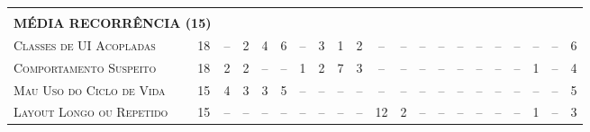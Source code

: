 \begin{table*}
\begin{tabular}{@{}p{3.5cm}p{0.3cm}p{.2cm}p{.2cm}p{.2cm}p{.2cm}p{.2cm}p{.2cm}p{.2cm}p{.2cm}p{.2cm}p{.4cm}p{.4cm}p{.4cm}p{.4cm}p{.4cm}p{.4cm}p{.4cm}p{.4cm}p{.4cm}p{0.2cm}@{}}
\vspace{1sp} \\
\multicolumn{2}{l}{\scriptsize{\textbf{MÉDIA RECORRÊNCIA (15)}}} \\ 
\textsc{Classes de UI Acopladas}           	& \multicolumn{1}{c}{18} 	& \multicolumn{1}{c}{--} 	& \multicolumn{1}{c}{2} 	& \multicolumn{1}{c}{4}	 	& \multicolumn{1}{c}{6} 	& \multicolumn{1}{c}{--} 	& \multicolumn{1}{c}{3} 	& \multicolumn{1}{c}{1} 	& \multicolumn{1}{c}{2} 	& \multicolumn{1}{c}{--} 	& \multicolumn{1}{c}{--} 	& \multicolumn{1}{c}{--} 	& \multicolumn{1}{c}{--} 	& \multicolumn{1}{c}{--} 	& \multicolumn{1}{c}{--} 	& \multicolumn{1}{c}{--}	& \multicolumn{1}{c}{--} 	& \multicolumn{1}{c}{--} 	& \multicolumn{1}{c}{--} 	& \multicolumn{1}{c}{6} \\
\textsc{Comportamento Suspeito}            	& \multicolumn{1}{c}{18} 	& \multicolumn{1}{c}{2} 	& \multicolumn{1}{c}{2} 	& \multicolumn{1}{c}{--} 	& \multicolumn{1}{c}{--} 	& \multicolumn{1}{c}{1} 	& \multicolumn{1}{c}{2} 	& \multicolumn{1}{c}{7} 	& \multicolumn{1}{c}{3} 	& \multicolumn{1}{c}{--} 	& \multicolumn{1}{c}{--} 	& \multicolumn{1}{c}{--} 	& \multicolumn{1}{c}{--} 	& \multicolumn{1}{c}{--} 	& \multicolumn{1}{c}{--} 	& \multicolumn{1}{c}{--}	& \multicolumn{1}{c}{--} 	& \multicolumn{1}{c}{1} 	& \multicolumn{1}{c}{--} 	& \multicolumn{1}{c}{4} \\
\textsc{Mau Uso do Ciclo de Vida}          	& \multicolumn{1}{c}{15} 	& \multicolumn{1}{c}{4} 	& \multicolumn{1}{c}{3} 	& \multicolumn{1}{c}{3}	 	& \multicolumn{1}{c}{5} 	& \multicolumn{1}{c}{--} 	& \multicolumn{1}{c}{--} 	& \multicolumn{1}{c}{--} 	& \multicolumn{1}{c}{--} 	& \multicolumn{1}{c}{--} 	& \multicolumn{1}{c}{--} 	& \multicolumn{1}{c}{--} 	& \multicolumn{1}{c}{--} 	& \multicolumn{1}{c}{--} 	& \multicolumn{1}{c}{--} 	& \multicolumn{1}{c}{--}	& \multicolumn{1}{c}{--} 	& \multicolumn{1}{c}{--} 	& \multicolumn{1}{c}{--} 	& \multicolumn{1}{c}{5} \\
\textsc{Layout Longo ou Repetido}          	& \multicolumn{1}{c}{15} 	& \multicolumn{1}{c}{--} 	& \multicolumn{1}{c}{--} 	& \multicolumn{1}{c}{--} 	& \multicolumn{1}{c}{--} 	& \multicolumn{1}{c}{--} 	& \multicolumn{1}{c}{--} 	& \multicolumn{1}{c}{--} 	& \multicolumn{1}{c}{--} 	& \multicolumn{1}{c}{12} 	& \multicolumn{1}{c}{2} 	& \multicolumn{1}{c}{--} 	& \multicolumn{1}{c}{--} 	& \multicolumn{1}{c}{--} 	& \multicolumn{1}{c}{--} 	& \multicolumn{1}{c}{--}	& \multicolumn{1}{c}{--} 	& \multicolumn{1}{c}{1} 	& \multicolumn{1}{c}{--} 	& \multicolumn{1}{c}{3} \\

\end{tabular}
\end{table*}
